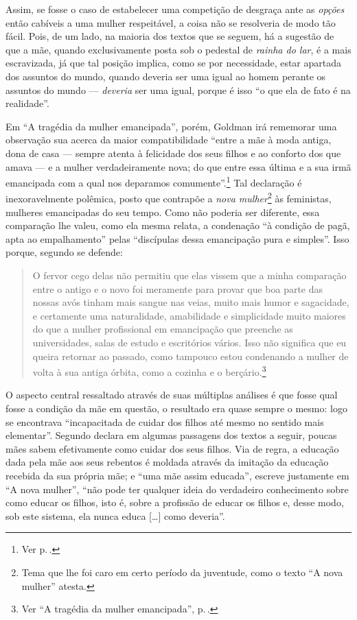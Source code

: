 Assim, se fosse o caso de
estabelecer uma competição de desgraça ante as \textit{opções} então cabíveis
a uma mulher respeitável, a coisa não se resolveria de modo tão fácil.
Pois, de um lado, na maioria dos textos que se seguem, há a sugestão de
que a mãe, quando exclusivamente posta sob o pedestal de \textit{rainha do
lar}, é a mais escravizada, já que tal posição implica, como se por
necessidade, estar apartada dos assuntos do mundo, quando deveria ser
uma igual ao homem perante os assuntos do mundo --- \textit{deveria} ser
uma igual, porque é isso ``o que ela de fato é na realidade''.

Em ``A
tragédia da mulher emancipada'', porém, Goldman irá rememorar uma
observação sua acerca da maior compatibilidade ``entre a mãe à moda antiga, dona de casa ---
sempre atenta à felicidade dos seus filhos e ao conforto dos que
amava --- e a mulher verdadeiramente nova; do que entre essa última e a sua
irmã emancipada com a qual nos deparamos comumente''.\footnote{Ver p.\,\pageref{mae}.} Tal declaração é inexoravelmente polêmica, posto que
contrapõe a \textit{nova mulher}\footnote{Tema que lhe foi caro em certo período da
juventude, como o texto ``A nova mulher'' atesta.} às
feministas, mulheres emancipadas do seu tempo. Como não poderia ser
diferente, essa comparação lhe valeu, como ela mesma relata, a condenação
``à condição de pagã,
apta ao empalhamento'' pelas ``discípulas dessa emancipação pura e
simples''. Isso porque, segundo se defende:

\begin{quote}
O fervor cego delas não permitiu que elas vissem que a
minha comparação entre o antigo e o novo foi meramente para provar que
boa parte das nossas avós tinham mais sangue nas veias, muito mais humor
e sagacidade, e certamente uma naturalidade, amabilidade e simplicidade
muito maiores do que a mulher profissional em emancipação que preenche
as universidades, salas de estudo e escritórios vários. Isso não
significa que eu queira retornar ao passado, como tampouco estou condenando a mulher de volta à sua antiga órbita, como a cozinha e o berçário.\footnote{Ver ``A tragédia da mulher emancipada'', p.\,\pageref{mae}.}
\end{quote}

O aspecto central ressaltado através de suas múltiplas análises é que
fosse qual fosse a condição da mãe em questão, o resultado era quase
sempre o mesmo: logo se encontrava ``incapacitada de cuidar dos filhos
até mesmo no sentido mais elementar''. Segundo declara em algumas
passagens dos textos a seguir, poucas mães sabem efetivamente como
cuidar dos seus filhos. Via de regra, a educação dada pela mãe aos seus
rebentos é moldada através da imitação da educação recebida da sua
própria mãe; e ``uma mãe assim educada'', escreve justamente em ``A nova
mulher'', ``não pode ter qualquer ideia do verdadeiro conhecimento sobre
como educar os filhos, isto é, sobre a profissão de educar os filhos e,
desse modo, sob este sistema, ela nunca educa {[}\ldots{]} como deveria''.

